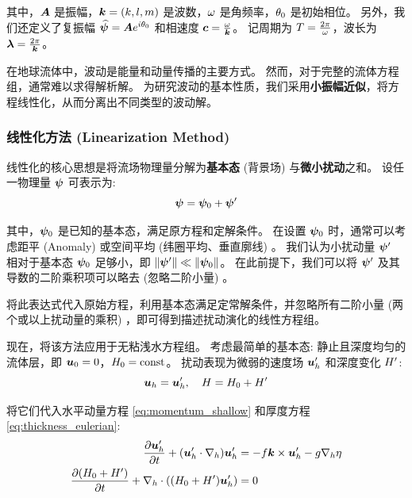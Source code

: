 其中，$\bm{A}$ 是振幅，$\bm{k} = (k, l, m)$ 是波数，$\omega$ 是角频率，$\theta_0$ 是初始相位。
另外，我们还定义了复振幅 $\widehat{\bm{\psi}} = \bm{A} e^{i \theta_0}$ 和相速度 $\bm{c} = \frac{\omega}{\bm{k}}$。
记周期为 $T = \frac{2\pi}{\omega}$，波长为 $\bm{\lambda} = \frac{2\pi}{\bm{k}}$。

在地球流体中，波动是能量和动量传播的主要方式。
然而，对于完整的流体方程组，通常难以求得解析解。
为研究波动的基本性质，我们采用\textbf{小振幅近似}，将方程线性化，从而分离出不同类型的波动解。

\subsubsection{线性化方法 (Linearization Method)}

线性化的核心思想是将流场物理量分解为\textbf{基本态} (背景场) 与\textbf{微小扰动}之和。
设任一物理量 $\bm{\psi}$ 可表示为:
\begin{equation}
    \bm{\psi} = \bm{\psi}_0 + \bm{\psi}^\prime
    \label{eq:wavefunc_decomposition}
\end{equation}

其中，$\bm{\psi}_0$ 是已知的基本态，满足原方程和定解条件。
在设置 $\bm{\psi}_0$ 时，通常可以考虑距平 (Anomaly) 或空间平均 (纬圈平均、垂直廓线) 。
我们认为小扰动量 $\bm{\psi}^\prime$ 相对于基本态 $\bm{\psi}_0$ 足够小，即 $\lVert \bm{\psi}^\prime \rVert \ll \lVert \bm{\psi}_0 \rVert$。
在此前提下，我们可以将 $\bm{\psi}^\prime$ 及其导数的二阶乘积项可以略去 (忽略二阶小量) 。

将此表达式代入原始方程，利用基本态满足定常解条件，并忽略所有二阶小量 (两个或以上扰动量的乘积) ，即可得到描述扰动演化的线性方程组。

现在，将该方法应用于无粘浅水方程组。
考虑最简单的基本态: 静止且深度均匀的流体层，即 $\bm{u}_0 = 0$，$H_0 = \text{const}$。
扰动表现为微弱的速度场 $\bm{u}_h^\prime$ 和深度变化 $H^\prime$:
\begin{equation*}
    \bm{u}_h = \bm{u}_h^\prime, \quad H = H_0 + H^\prime
\end{equation*}

将它们代入水平动量方程 \eqref{eq:momentum_shallow} 和厚度方程 \eqref{eq:thickness_eulerian}:
\begin{align*}
    \pde{\vel_h^\prime}{\timevar} + (\vel_h^\prime \cdot \nabla_h) \vel_h^\prime &= - \coriolis \kvec \times \vel_h^\prime - \gravityconst \nabla_h \freeheight \\
    \pde{(\depth_0 + \depth^\prime)}{\timevar} + \nabla_h \cdot ((\depth_0 + \depth^\prime)\vel_h^\prime) &= 0
\end{align*}

